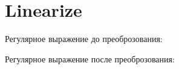 \section{Linearize}
\begin{frame}{}
	Регулярное выражение до преоброзования:


	Регулярное выражение после преоброзования:

\end{frame}
